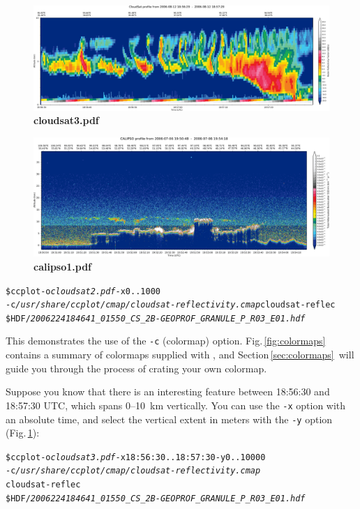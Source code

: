\begin{figure}[t]
\includegraphics[width=\textwidth]{images/cloudsat3.pdf}
\caption[cloudsat3.pdf]{\textbf{cloudsat3.pdf}}
\label{fig:cloudsat3}
\end{figure}

\begin{figure}[t]
\includegraphics[width=\textwidth]{images/calipso1.pdf}
\caption[calipso1.pdf]{\textbf{calipso1.pdf}}
\label{fig:calipso1}
\end{figure}

\begin{alltt}
\$ ccplot -o \textit{cloudsat2.pdf} -x 0..1000
-c \textit{/usr/share/ccplot/cmap/cloudsat-reflectivity.cmap} cloudsat-reflec
\$HDF/\textit{2006224184641_01550_CS_2B-GEOPROF_GRANULE_P_R03_E01.hdf}
\end{alltt}

\noindent This demonstrates the use of the \texttt{-c} (colormap) option.
Fig.\,\ref{fig:colormaps} contains a summary of colormaps supplied with \ccplot,
and Section\,\ref{sec:colormaps}\, will
guide you through the process of crating your own colormap.


Suppose you know that there is an interesting feature between 18:56:30 and
18:57:30 UTC, which spans 0--\SI{10}{km} vertically. You can use the \texttt{-x}
option with an absolute time, and select the vertical extent in meters with the
\texttt{-y} option (Fig.\,\ref{fig:cloudsat3}):

\begin{alltt}
\$ ccplot -o \textit{cloudsat3.pdf} -x 18:56:30..18:57:30 -y 0..10000
-c \textit{/usr/share/ccplot/cmap/cloudsat-reflectivity.cmap}
cloudsat-reflec
\$HDF/\textit{2006224184641_01550_CS_2B-GEOPROF_GRANULE_P_R03_E01.hdf}
\end{alltt}

